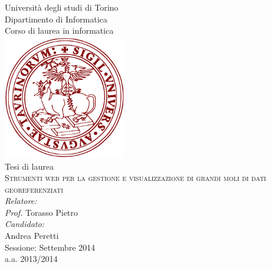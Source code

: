 
\begin{titlepage}
\begin{center}

{\LARGE Università degli studi di Torino}\\
{Dipartimento di Informatica}\\[1cm]

{\Large Corso di laurea in informatica}\\[0.5cm]
\includegraphics[width=0.40\textwidth]{img/unitologo.png}~\\[0.5cm]

{Tesi di laurea}\\[1cm]
\textsc{\LARGE Strumenti web per la gestione e visualizzazione di grandi moli di dati georeferenziati}\\[1.5cm]


{\emph{Relatore:}}\\
{\emph{Prof.} Torasso Pietro}\\[1cm]

{\emph{Candidato:}}\\
{Andrea Peretti}\\[1.5cm]
{\Large Sessione: Settembre 2014}\\
{a.a. 2013/2014}




\vfill

\end{center}
\end{titlepage}
